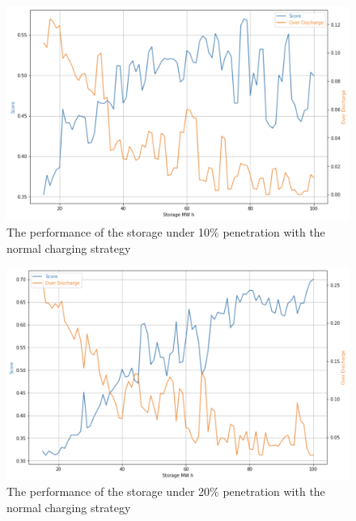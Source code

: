 \documentclass[12pt,a4paper]{report}
\begin{document}
            \begin{figure}[ht]
                \centerline{\includegraphics[scale=0.9]{simu_score_normal_10}}
                \caption{The performance of the storage under 10\% penetration with the normal charging strategy}
                \label{fig_simu_score_normal_10}
            \end{figure}


            \begin{figure}[ht]
                \centerline{\includegraphics[scale=0.9]{simu_score_normal_20}}
                \caption{The performance of the storage under 20\% penetration with the normal charging strategy}
                \label{fig_simu_score_normal_20}
            \end{figure}

\end{document}
